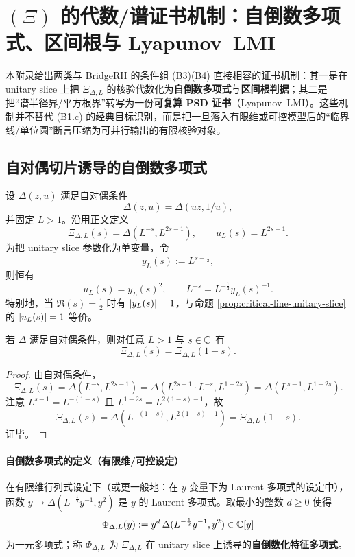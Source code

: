 \section{\texorpdfstring{$(\Xi)$}{(Xi)} 的代数/谱证书机制：自倒数多项式、区间根与 Lyapunov--LMI}\label{app:xi-certificate-layer}

本附录给出两类与 BridgeRH 的条件组 (B3)(B4) 直接相容的证书机制：其一是在 unitary slice 上把 $\Xi_{\Delta,L}$ 的核验代数化为\textbf{自倒数多项式}与\textbf{区间根判据}；其二是把“谱半径界/平方根界”转写为一份\textbf{可复算 PSD 证书}（Lyapunov--LMI）。这些机制并不替代 (B1.c) 的经典目标识别，而是把一旦落入有限维或可控模型后的“临界线/单位圆”断言压缩为可并行输出的有限核验对象。

\subsection{自对偶切片诱导的自倒数多项式}\label{subsec:xi-reciprocal-polynomial}
设 $\Delta(z,u)$ 满足自对偶条件
$$
\Delta(z,u)=\Delta(uz,1/u),
$$
并固定 $L>1$。沿用正文定义
$$
\Xi_{\Delta,L}(s)=\Delta(L^{-s},L^{2s-1}),\qquad u_L(s)=L^{2s-1}.
$$
为把 unitary slice 参数化为单变量，令
$$
y_L(s):=L^{s-\frac12},
$$
则恒有
$$
u_L(s)=y_L(s)^2,\qquad L^{-s}=L^{-\frac12}y_L(s)^{-1}.
$$
特别地，当 $\Re(s)=\tfrac12$ 时有 $\left\lvert y_L(s)\right\rvert=1$，与命题 \ref{prop:critical-line-unitary-slice} 的 $\left\lvert u_L(s)\right\rvert=1$ 等价。

\begin{proposition}\label{prop:xi-functional-equation-self-dual}
若 $\Delta$ 满足自对偶条件，则对任意 $L>1$ 与 $s\in\mathbb{C}$ 有
$$
\Xi_{\Delta,L}(s)=\Xi_{\Delta,L}(1-s).
$$
\end{proposition}
\begin{proof}
由自对偶条件，
$$
\Xi_{\Delta,L}(s)=\Delta(L^{-s},L^{2s-1})
=\Delta(L^{2s-1}\cdot L^{-s},L^{1-2s})
=\Delta(L^{s-1},L^{1-2s}).
$$
注意 $L^{s-1}=L^{-(1-s)}$ 且 $L^{1-2s}=L^{2(1-s)-1}$，故
$$
\Xi_{\Delta,L}(s)=\Delta(L^{-(1-s)},L^{2(1-s)-1})=\Xi_{\Delta,L}(1-s).
$$
证毕。
\end{proof}

\paragraph{自倒数多项式的定义（有限维/可控设定）}
在有限维行列式设定下（或更一般地：在 $y$ 变量下为 Laurent 多项式的设定中），函数
$
y\mapsto \Delta(L^{-\frac12}y^{-1},y^2)
$
是 $y$ 的 Laurent 多项式。取最小的整数 $d\ge 0$ 使得
$$
\Phi_{\Delta,L}(y):=y^d\,\Delta(L^{-\frac12}y^{-1},y^2)\in\mathbb{C}[y]
$$
为一元多项式；称 $\Phi_{\Delta,L}$ 为 $\Xi_{\Delta,L}$ 在 unitary slice 上诱导的\textbf{自倒数化特征多项式}。

